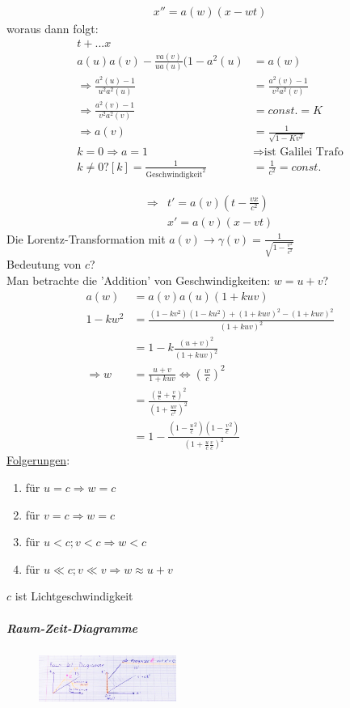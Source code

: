 \begin{description}
\begin{enumerate}
\begin{align*}
x''=a(w)(x-wt)
\end{align*}
woraus dann folgt:
\begin{align*}
[a(u)a(v)-\frac{va(v)}{ua(u)}			&(1-a^2(u)]t+...x \\
a(u)a(v)-\frac{va(v)}{ua(u)}(1-a^2(u) 	&=a(w)\\
\Rightarrow\frac{a^2(u)-1}{u^2a^2(u)} 	&=\frac{a^2(v)-1}{v^2a^2(v)}\\
\Rightarrow \frac{a^2(v)-1}{v^2a^2(v)} 	&=const.=K \\
\Rightarrow a(v) 						&=\frac{1}{\sqrt{1-Kv^2}}\\
 k=0\Rightarrow a=1 						&\Rightarrow \text{ist Galilei Trafo}\\
 k\neq 0? [k]=\frac{1}{\text{Geschwindigkeit}^2} &=\frac{1}{c^2}=const.
\end{align*}

\begin{align*}
 \Rightarrow &t'=a(v)(t-\frac{vx}{c^2})\\
 &x'=a(v)(x-vt)
\end{align*}
Die Lorentz-Transformation mit $a(v)\rightarrow \gamma(v)=\frac{1}{\sqrt{1-\frac{v^2}{c^2}}}$\\
Bedeutung von $c$?\\
Man betrachte die 'Addition' von Geschwindigkeiten: $w=u+v$?
\begin{align*}
a(w)		&=a(v)a(u)(1+kuv)\\
1-kw^2	&=\frac{(1-kv^2)(1-ku^2)+(1+kuv)^2-(1+kuv)^2}{(1+kuv)^2}\\
		&=1-k\frac{(u+v)^2}{(1+kuv)^2}\\
\Rightarrow w	&=\frac{u+v}{1+kuv}\Leftrightarrow(\frac{w}{c})^2\\
		&=\frac{(\frac{u}{c}+\frac{v}{c})^2}{(1+\frac{uv}{c^2})^2}\\
		&=1-\frac{(1-\frac{u}{c}^2)(1-\frac{v}{c}^2)}{(1+\frac{u}{c}\frac{v}{c})^2}
\end{align*}
\underline{Folgerungen}:
\begin{enumerate}
\item für $u=c\Rightarrow w=c$
\item für $v=c\Rightarrow w=c$
\item für $u<c; v<c \Rightarrow w<c$
\item für $u\ll c; v\ll v \Rightarrow w\approx u+v$
\end{enumerate}
$c$ ist Lichtgeschwindigkeit
\end{enumerate}
\subparagraph*{Raum-Zeit-Diagramme}
\begin{figure}[h]
\begin{center}
\includegraphics[width=0.4\textwidth]{Skizzen/Anhang3Kopie.jpg}
\end{center}
\caption{}
\end{figure}
\end{description}
